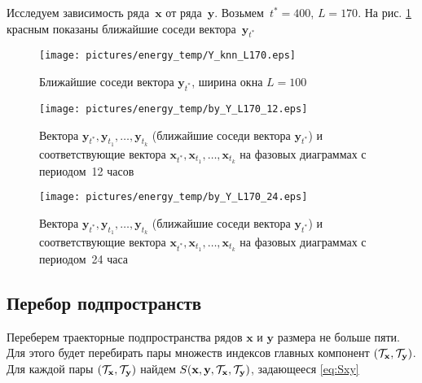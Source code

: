 \documentclass[14pt]{article}
\newcommand{\bx}{\mathbf{x}}
\newcommand{\by}{\mathbf{y}}
\begin{document}

Исследуем зависимость ряда~$\bx$ от ряда~$\by$. Возьмем~$t^* = 400$, ${L = 170}$. На рис.  \ref{Y400_L170_knn} красным показаны ближайшие соседи вектора~$\by_{t^*}$

\begin{figure}[H]
\begin{center}
\texttt{[image: pictures/energy\_temp/Y\_knn\_L170.eps]}
\vspace{-4mm}
\caption{Ближайшие соседи вектора $\by_{t^*}$, ширина окна $L = 100$}
\label{Y400_L170_knn}
\end{center}
\end{figure}

\vspace{-5mm}

\begin{figure}[H]
\begin{center}
\texttt{[image: pictures/energy\_temp/by\_Y\_L170\_12.eps]}
\vspace{-4mm}
\caption{Вектора $\by_{t^*}, \by_{t_1}, \ldots, \by_{t_k}$ (ближайшие соседи вектора $\by_{t^*}$) и соответствующие вектора $\bx_{t^*}, \bx_{t_1}, \ldots, \bx_{t_k}$ на фазовых диаграммах с периодом~12 часов}
\end{center}
\end{figure}

\vspace{-3mm}

\begin{figure}[H]
\begin{center}
\texttt{[image: pictures/energy\_temp/by\_Y\_L170\_24.eps]}
\vspace{-4mm}
\caption{Вектора $\by_{t^*}, \by_{t_1}, \ldots, \by_{t_k}$ (ближайшие соседи вектора $\by_{t^*}$) и соответствующие вектора $\bx_{t^*}, \bx_{t_1}, \ldots, \bx_{t_k}$ на фазовых диаграммах с периодом~24 часа}
\end{center}
\end{figure}

\subsection{Перебор подпространств}
Переберем траекторные подпространства рядов $\bx$ и $\by$ размера не больше пяти. Для этого будет перебирать пары множеств индексов главных компонент $\left(\cT_{\bx}, \cT_{\by}\right)$. Для каждой пары $\left(\cT_{\bx}, \cT_{\by}\right)$ найдем $S(\bx, \by, \cT_{\bx}, \cT_{\by})$, задающееся \eqref{eq:Sxy}
\end{document}
